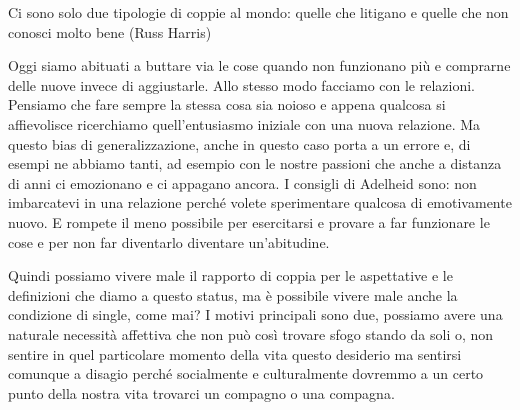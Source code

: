 \documentclass[12pt]{book} %
\begin{document}
\bigskip

Ci sono solo due tipologie di coppie al mondo: quelle che litigano e quelle che non conosci molto bene (Russ Harris)


\bigskip

Oggi siamo abituati a buttare via le cose quando non funzionano più e comprarne delle nuove invece di aggiustarle. Allo
stesso modo facciamo con le relazioni. Pensiamo che fare sempre la stessa cosa sia noioso e appena qualcosa si
affievolisce ricerchiamo quell'entusiasmo iniziale con una nuova relazione. Ma questo bias di
generalizzazione, anche in questo caso porta a un errore e, di esempi ne abbiamo tanti, ad esempio con le nostre
passioni che anche a distanza di anni ci emozionano e ci appagano ancora. I consigli di Adelheid sono: non imbarcatevi
in una relazione perché volete sperimentare qualcosa di emotivamente nuovo. E rompete il meno possibile per esercitarsi
e provare a far funzionare le cose e per non far diventarlo diventare
un'abitudine.


\bigskip

Quindi possiamo vivere male il rapporto di coppia per le aspettative e le definizioni che diamo a questo status, ma è
possibile vivere male anche la condizione di single, come mai? I motivi principali sono due, possiamo avere una
naturale necessità affettiva che non può così trovare sfogo stando da soli o, non sentire in quel particolare momento
della vita questo desiderio ma sentirsi comunque a disagio perché socialmente e culturalmente dovremmo a un certo punto
della nostra vita trovarci un compagno o una compagna.


\bigskip
\end{document}
